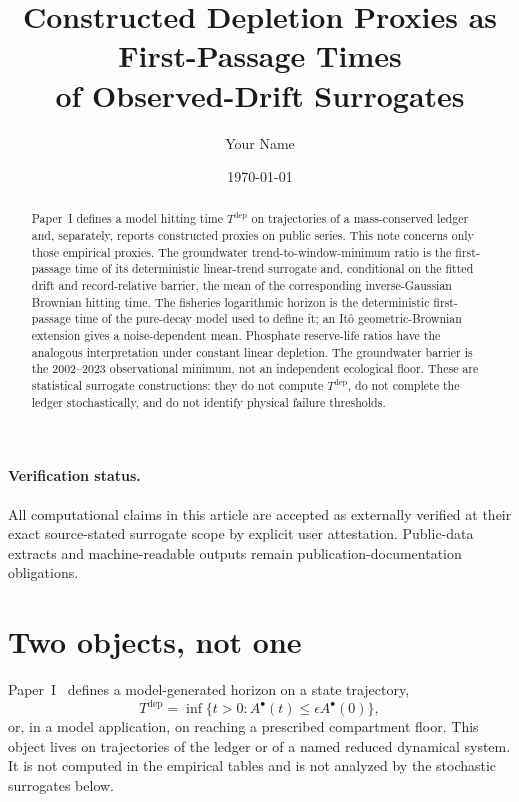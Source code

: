 \documentclass[11pt]{article}
\title{Constructed Depletion Proxies as First-Passage Times\\of Observed-Drift Surrogates}
\author{Your Name}
\date{\today}
\theoremstyle{definition}
\begin{document}
\maketitle

\begin{abstract}
Paper~I defines a model hitting time $T^{\mathrm{dep}}$ on trajectories of a mass-conserved ledger and, separately, reports constructed proxies on public series. This note concerns only those empirical proxies. The groundwater trend-to-window-minimum ratio is the first-passage time of its deterministic linear-trend surrogate and, conditional on the fitted drift and record-relative barrier, the mean of the corresponding inverse-Gaussian Brownian hitting time. The fisheries logarithmic horizon is the deterministic first-passage time of the pure-decay model used to define it; an It\^o geometric-Brownian extension gives a noise-dependent mean. Phosphate reserve-life ratios have the analogous interpretation under constant linear depletion. The groundwater barrier is the 2002--2023 observational minimum, not an independent ecological floor. These are statistical surrogate constructions: they do not compute $T^{\mathrm{dep}}$, do not complete the ledger stochastically, and do not identify physical failure thresholds.
\end{abstract}

\paragraph{Verification status.} All computational claims in this article are accepted as externally verified at their exact source-stated surrogate scope by explicit user attestation. Public-data extracts and machine-readable outputs remain publication-documentation obligations.

\section{Two objects, not one}
\label{sec:proxies}

Paper~I~\cite{paperI} defines a model-generated horizon on a state trajectory,
\begin{equation}
T^{\mathrm{dep}}=\inf\{t>0:A^\bullet(t)\le \epsilon A^\bullet(0)\},
\label{eq:model-hitting}
\end{equation}
or, in a model application, on reaching a prescribed compartment floor. This object lives on trajectories of the ledger or of a named reduced dynamical system. It is not computed in the empirical tables and is not analyzed by the stochastic surrogates below.
\end{document}

